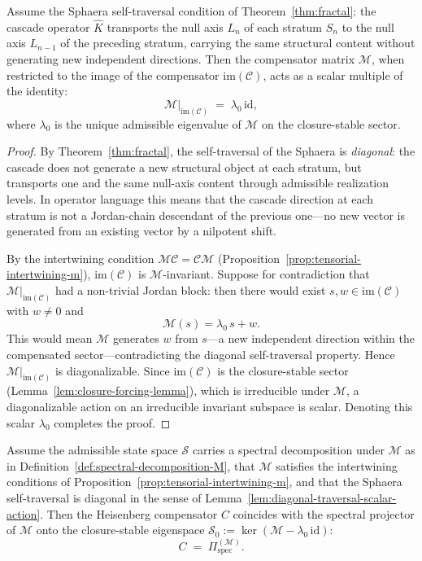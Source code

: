 \begin{lemma}
\label{lem:diagonal-traversal-scalar-action}
Assume the Sphaera self-traversal condition of Theorem~\ref{thm:fractal}:
the cascade operator $\hat{K}$ transports the null axis $L_n$ of each
stratum $S_n$ to the null axis $L_{n-1}$ of the preceding stratum,
carrying the same structural content without generating new independent
directions. Then the compensator matrix $\mathcal{M}$, when restricted to
the image of the compensator $\mathrm{im}(\mathcal{C})$, acts as a scalar
multiple of the identity:
\[
 \mathcal{M}\big|_{\mathrm{im}(\mathcal{C})} \;=\; \lambda_0\,\mathrm{id},
\]
where $\lambda_0$ is the unique admissible eigenvalue of $\mathcal{M}$ on
the closure-stable sector.
\end{lemma}

\begin{proof}
By Theorem~\ref{thm:fractal}, the self-traversal of the Sphaera is
\emph{diagonal}: the cascade does not generate a new structural object at
each stratum, but transports one and the same null-axis content through
admissible realization levels. In operator language this means that the
cascade direction at each stratum is not a Jordan-chain descendant of the
previous one---no new vector is generated from an existing vector by a
nilpotent shift.

By the intertwining condition $\mathcal{M}\mathcal{C} = \mathcal{C}\mathcal{M}$
(Proposition~\ref{prop:tensorial-intertwining-m}), $\mathrm{im}(\mathcal{C})$
is $\mathcal{M}$-invariant. Suppose for contradiction that
$\mathcal{M}|_{\mathrm{im}(\mathcal{C})}$ had a non-trivial Jordan block:
then there would exist $s,w \in \mathrm{im}(\mathcal{C})$ with $w\neq 0$ and
\[
 \mathcal{M}(s) = \lambda_0\,s + w.
\]
This would mean $\mathcal{M}$ generates $w$ from $s$---a new independent
direction within the compensated sector---contradicting the diagonal
self-traversal property. Hence $\mathcal{M}|_{\mathrm{im}(\mathcal{C})}$
is diagonalizable. Since $\mathrm{im}(\mathcal{C})$ is the closure-stable
sector (Lemma~\ref{lem:closure-forcing-lemma}), which is irreducible under
$\mathcal{M}$, a diagonalizable action on an irreducible invariant subspace
is scalar. Denoting this scalar $\lambda_0$ completes the proof.
\end{proof}

\begin{theorem}
\label{thm:hc-spectral-projector}
Assume the admissible state space $\mathcal{S}$ carries a spectral
decomposition under $\mathcal{M}$ as in
Definition~\ref{def:spectral-decomposition-M}, that $\mathcal{M}$ satisfies
the intertwining conditions of Proposition~\ref{prop:tensorial-intertwining-m},
and that the Sphaera self-traversal is diagonal in the sense of
Lemma~\ref{lem:diagonal-traversal-scalar-action}. Then the Heisenberg
compensator $C$ coincides with the spectral projector of $\mathcal{M}$
onto the closure-stable eigenspace $\mathcal{S}_0 :=
\ker(\mathcal{M} - \lambda_0\,\mathrm{id})$:
\[
 C \;=\; \Pi^{(\mathcal{M})}_{\mathrm{spec}}.
\]
\end{theorem}

